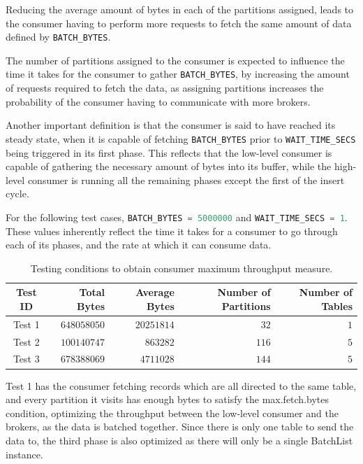 Reducing the average amount of bytes in each of the partitions assigned, leads
to the consumer having to perform more requests to fetch the same amount of data
defined by \lstinline[language=Python]{BATCH_BYTES}. 

The number of partitions assigned to the consumer is expected to influence the
time it takes for the consumer to gather
\lstinline[language=Python]{BATCH_BYTES}, by increasing the amount of requests
required to fetch the data, as assigning partitions increases the probability of
the consumer having to communicate with more brokers. 

Another important definition is that the consumer is said to have reached its
steady state, when it is capable of fetching
\lstinline[language=Python]{BATCH_BYTES} prior to
\lstinline[language=Python]{WAIT_TIME_SECS} being triggered in its first phase.
This reflects that the low-level consumer is capable of gathering the necessary
amount of bytes into its buffer, while the high-level consumer is running all
the remaining phases except the first of the insert cycle.

For the following test cases, \lstinline[language=Python]{BATCH_BYTES = 5000000}
and \lstinline[language=Python]{WAIT_TIME_SECS = 1}.  These values inherently
reflect the time it takes for a consumer to go through each of its phases, and
the rate at which it can consume data.

\begin{table}[H] 
\centering 
\caption{
    Testing conditions to obtain consumer maximum throughput measure.
} 
    \begin{tabular}{ |c|r|r|r|r| } 
        \hline
        \textbf{Test ID} & \textbf{Total Bytes} & \textbf{Average Bytes} &
            \textbf{Number of Partitions} & \textbf{Number of Tables} \\ 
        \hline 
        Test 1 & $648058050$ & $20251814$ & $32$ & $1$ \\ 
        Test 2 & $100140747$ & $863282$ & $116$ & $5$ \\ 
        Test 3 & $678388069$ & $4711028$ & $144$ & $5$ \\ 
        \hline
    \end{tabular} 
\end{table}

Test 1 has the consumer fetching records which are all directed to the same
table, and every partition it visits has enough bytes to satisfy the
max.fetch.bytes condition, optimizing the throughput between the low-level
consumer and the brokers, as the data is batched together. Since there is only
one table to send the data to, the third phase is also optimized as there will
only be a single BatchList instance.

